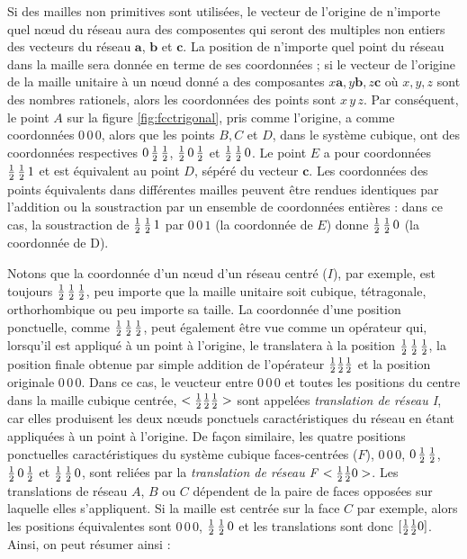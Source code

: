 Si des mailles non primitives sont utilisées, le vecteur de l'origine de
n'importe quel nœud du réseau aura des composentes qui seront des multiples non
entiers des  vecteurs du réseau $\mathbf{a}$, $\mathbf{b}$ et $\mathbf{c}$. La
position de n'importe quel point du réseau dans la maille sera donnée en terme de
ses coordonnées ; si le vecteur de l'origine de la maille unitaire à un nœud
donné a des composantes $x\mathbf{a}, y\mathbf{b}, z\mathbf{c}$ où $x,y,z$ sont
des nombres rationels, alors les coordonnées des points sont $x\,y\,z$. Par
conséquent, le point $A$ sur la figure \ref{fig:fcctrigonal}, pris comme
l'origine, a comme coordonnées $0\,0\,0$, alors que les points $B, C$ et $D$,
dans le système cubique, ont des coordonnées respectives $0\,\mbox{$\frac{1}{2}$}\,\mbox{$\frac{1}{2}$}$,
$\mbox{$\frac{1}{2}$}\,0\,\mbox{$\frac{1}{2}$}$ et $\mbox{$\frac{1}{2}$}\,\mbox{$\frac{1}{2}$}\,0$. Le point $E$ a pour coordonnées
$\mbox{$\frac{1}{2}$}\,\mbox{$\frac{1}{2}$}\,1$ et est équivalent au point $D$, sépéré du vecteur $\mathbf{c}$.
Les coordonnées des points équivalents dans différentes mailles peuvent être
rendues identiques par l'addition ou la soustraction par un ensemble de
coordonnées entières : dans ce cas, la soustraction de $\mbox{$\frac{1}{2}$}\,\mbox{$\frac{1}{2}$}\,1$ par
$0\,0\,1$ (la coordonnée de $E$) donne $\mbox{$\frac{1}{2}$}\,\mbox{$\frac{1}{2}$}\,0$ (la coordonnée de D).

Notons que la coordonnée d'un nœud d'un réseau centré ($I$), par exemple, est
toujours $\mbox{$\frac{1}{2}$}\,\mbox{$\frac{1}{2}$}\,\mbox{$\frac{1}{2}$}$, peu importe que la maille unitaire soit cubique,
tétragonale, orthorhombique ou peu importe sa taille. La coordonnée d'une
position ponctuelle, comme $\mbox{$\frac{1}{2}$}\,\mbox{$\frac{1}{2}$}\,\mbox{$\frac{1}{2}$}$, peut également être vue comme
un opérateur qui, lorsqu'il est appliqué à un point à l'origine, le translatera à
la position $\mbox{$\frac{1}{2}$}\,\mbox{$\frac{1}{2}$}\,\mbox{$\frac{1}{2}$}$, la position finale obtenue par simple addition
de l'opérateur $\mbox{$\frac{1}{2}$}\mbox{$\frac{1}{2}$}\mbox{$\frac{1}{2}$}$ et la position originale $0\,0\,0$. Dans ce cas,
le veucteur entre $0\,0\,0$ et toutes les positions du centre dans la maille
cubique centrée, \ie $<\mbox{$\frac{1}{2}$}\mbox{$\frac{1}{2}$}\mbox{$\frac{1}{2}$}>$ sont appelées \emph{translation de
réseau I}, car elles produisent les deux nœuds ponctuels caractéristiques
du réseau en étant appliquées à un point à l'origine. De façon similaire, les
quatre positions ponctuelles caractéristiques du système cubique faces-centrées
($F$), \ie $0\,0\,0$, $0\,\mbox{$\frac{1}{2}$}\,\mbox{$\frac{1}{2}$}$, $\mbox{$\frac{1}{2}$}\,0\,\mbox{$\frac{1}{2}$}$ et $\mbox{$\frac{1}{2}$}\,\mbox{$\frac{1}{2}$}\,0$,
sont reliées par la \emph{translation de réseau F} $<\mbox{$\frac{1}{2}$}\mbox{$\frac{1}{2}$} 0>$. Les
translations de réseau $A$, $B$ ou $C$  dépendent de la paire de faces opposées
sur laquelle elles s'appliquent. Si la maille est centrée sur la face $C$ par
exemple, alors les positions équivalentes sont $0\,0\,0$, $\mbox{$\frac{1}{2}$}\,\mbox{$\frac{1}{2}$}\,0$ et
les translations sont donc $[\mbox{$\frac{1}{2}$}\mbox{$\frac{1}{2}$} 0]$. Ainsi, on peut résumer ainsi :

